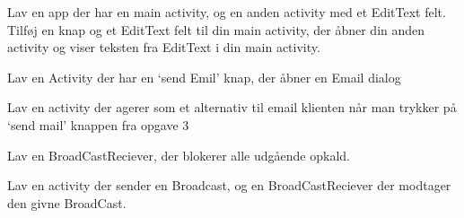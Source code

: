 \begin{exercise}
	Lav en app der har en main activity, og en anden activity med et EditText felt. Tilføj en knap og et EditText felt til din main activity, der åbner din anden activity og viser teksten fra EditText i din main activity.
\end{exercise}

\begin{exercise}
	Lav en Activity der har en ‘send Emil’ knap, der åbner en Email dialog
\end{exercise}

\begin{exercise}
	Lav en activity der agerer som et alternativ til email klienten når man trykker på ‘send mail’ knappen fra opgave 3
\end{exercise}

\begin{exercise}
	Lav en BroadCastReciever, der blokerer alle udgående opkald.
\end{exercise}

\begin{exercise}
	Lav en activity der sender en Broadcast, og en BroadCastReciever der modtager den givne BroadCast.
\end{exercise}

